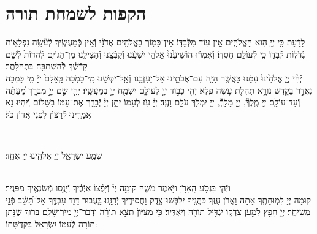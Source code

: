 \documentclass[twoside, openany, parskip=half, 11pt]{book}
\begin{document}
\chapter[הקפות לשמחת תורה]{ הקפות לשמחת תורה }


לָדַ֔עַת כִּ֥י יְיָ֖ ה֣וּא הָאֱלֹהִ֑ים אֵ֥ין ע֖וֹד מִלְּֿבַדּֽוֹ׃ \hfill \break
אֵין־כָּמ֖וֹךָ בָאֱלֹהִ֥ים אֲדֹנָ֗י וְֿאֵ֣ין כְּֽֿמַעֲשֶֽׂיךָ׃ \hfill \break
לְֿעֹ֘שֵׂ֤ה נִפְלָא֣וֹת גְּֿדֹל֣וֹת לְֿבַדּ֑וֹ כִּ֖י לְֿעוֹלָ֣ם חַסְדּֽוֹ׃ \hfill \break
וְֿאִמְר֕וּ הוֹשִׁיעֵ֙נוּ֙ אֱלֹהֵ֣י יִשְׁעֵ֔נוּ וְֿקַבְּֿצֵ֥נוּ וְֿהַצִּילֵ֖נוּ מִן־הַגּוֹיִ֑ם לְֿהֹדוֹת֙ לְֿשֵׁ֣ם קָדְֿשֶׁ֔ךָ לְֿהִשְׁתַּבֵּ֖חַ בִּתְהִלָּתֶֽךָ׃\\
יְֿהִ֨י יְיָ֤ אֱלֹהֵ֙ינוּ֙ עִמָּ֔נוּ כַּאֲשֶׁ֥ר הָיָ֖ה עִם־אֲבֹתֵ֑ינוּ אַל־יַעַזְבֵ֖נוּ וְֿאַֽל־יִטְּשֵֽׁנוּ׃ \hfill \break
מִֽי־כָמֹ֤כָה בָּֽאֵלִם֙ יְיָ֔ מִ֥י כָּמֹ֖כָה נֶאְדָּ֣ר בַּקֹּ֑דֶשׁ נוֹרָ֥א תְֿהִלֹּ֖ת עֹ֥שֵׂה פֶֽלֶא׃ \hfill \break
יְֿהִ֤י כְב֣וֹד יְיָ֣ לְֿעוֹלָ֑ם יִשְׂמַ֖ח יְיָ֣ בְּֿמַעֲשָֽׂיו׃ \hfill \break
יְֿהִ֤י שֵׁ֣ם יְיָ֣ מְֿבֹרָ֑ךְ מֵ֝עַתָּ֗ה וְֿעַד־עוֹלָֽם׃ \hfill \break
יְיָ֣ מֶֽלֶךְ֘, יְיָ֣ מָלָךְֿ֘, יְיָ֥ יִמְלֹ֖ךְ עֹלָ֥ם וָעֶֽד׃ \hfill \break
יְיָ֗ עֹ֖ז לְעַמּ֣וֹ יִתֵּ֑ן יְיָ֓ יְֿבָרֵ֖ךְ אֶת־עַמּ֣וֹ בַשָּׁלֽוֹם׃ \hfill \break
וְֿיִהְיוּ נָא אֲמָרֵֽינוּ לְֿרָצוֹן לִפְנֵי אֲדוֹן כֹּל׃ \hfill \break

\vspace{-1.3\baselineskip}

\\
\begin{large}
שְֿׁמַ֖ע יִשְׂרָאֵ֑ל יְיָ֥ אֱלֹהֵ֖ינוּ יְיָ֥ אֶחָֽד׃
\end{large}

\\
וַיְֿהִ֛י בִּנְסֹ֥עַ הָֽאָרֹ֖ן וַיֹּ֣אמֶר מֹשֶׁ֑ה קוּמָ֣ה יְיָ֗ וְֿיָפֻ֨צוּ֙ אֹֽיְֿבֶ֔יךָ וְֿיָנֻ֥סוּ מְֿשַׂנְאֶ֖יךָ מִפָּנֶֽיךָ׃\\
קוּמָה יְיָ לִמְוּחָתֶֽךָ אַתָה וַאֲרֹן עֻזֶּֽךָ׃ \hfill \break
כֹּהֲנֶ֥יךָ יִלְבְּשׁוּ־צֶ֑דֶק וַחֲסִידֶ֥יךָ יְֿרַנֵּֽנוּ׃ \hfill \break
בַּֽ֭עֲבוּר דָּוִ֣ד עַבְדֶּ֑ךָ אַל־תָּ֝שֵׁ֗ב פְּֿנֵ֣י מְֿשִׁיחֶֽךָ׃ \hfill \break
יְיָ֥ חָפֵ֖ץ לְֿמַ֣עַן צִדְק֑וֹ יַגְדִּ֥יל תּוֹרָ֖ה וְֿיַאְדִּֽיר׃ \hfill \break
כִּ֤י מִצִּיּוֹן֙ תֵּצֵ֣א תוֹרָ֔ה וּדְבַר־יְיָ֖ מִירֽוּשָׁלָֽםִ׃ \hfill \break
בָּרוּךְ שֶׁנָּתַן תּוֹרָה לְֿעַמּוֹ יִשְׂרָאֵל בִּקְדֻשָּׁתוֹ: \hfill \break
\end{document}
